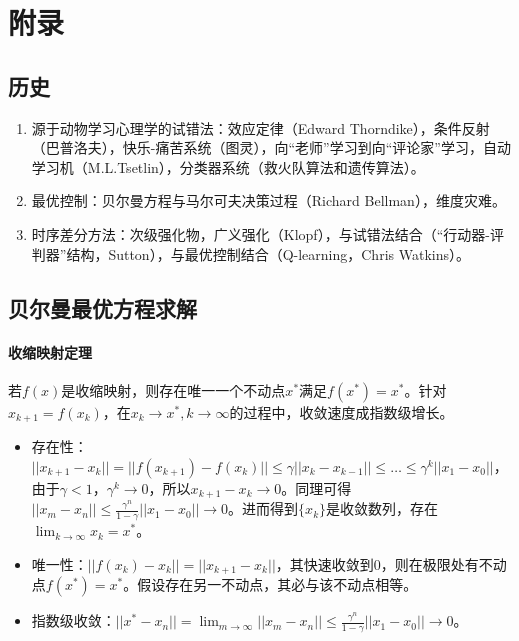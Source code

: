 \documentclass[
12pt, %
a4paper, 
oneside, %
headinclude,footinclude, %
]{scrartcl}
\begin{document}
\section{附录}
\subsection{历史}
\begin{enumerate}
\item 源于动物学习心理学的试错法：效应定律（Edward Thorndike），条件反射（巴普洛夫），快乐-痛苦系统（图灵），向“老师”学习到向“评论家”学习，自动学习机（M.L.Tsetlin），分类器系统（救火队算法和遗传算法）。
\item 最优控制：贝尔曼方程与马尔可夫决策过程（Richard Bellman），维度灾难。
\item 时序差分方法：次级强化物，广义强化（Klopf），与试错法结合（“行动器-评判器”结构，Sutton），与最优控制结合（Q-learning，Chris Watkins）。
\end{enumerate}
\subsection{贝尔曼最优方程求解}\label{sec:Scalability Mapping}
\paragraph{收缩映射定理}
若$ f(x) $是收缩映射，则存在唯一一个不动点$ x^* $满足$ f(x^*) = x^* $。针对$ x_{k + 1} = f(x_k) $，在$ x_k \to x^*, k \to \infty $的过程中，收敛速度成指数级增长。
\begin{itemize}
\item 存在性：$ ||x_{k + 1} - x_k|| = ||f(x_{k + 1}) - f(x_k)|| \leq \gamma||x_k - x_{k - 1}|| \leq \dots \leq \gamma^k||x_1 - x_0|| $，由于$ \gamma < 1 $，$ \gamma^k \to 0 $，所以$ x_{k + 1} - x_k \to 0 $。同理可得$ ||x_m - x_n|| \leq \frac{\gamma^n}{1 - \gamma}||x_1 - x_0|| \to 0 $。进而得到$ \{x_k\} $是收敛数列，存在$ \lim_{k \to \infty} x_k = x^* $。
\item 唯一性：$ ||f(x_k) - x_k|| = ||x_{k + 1} - x_k||$，其快速收敛到$ 0 $，则在极限处有不动点$ f(x^*) = x^* $。假设存在另一不动点，其必与该不动点相等。
\item 指数级收敛：$ ||x^* - x_n|| = \lim_{m \to \infty}||x_m - x_n|| \leq \frac{\gamma^n}{1 - \gamma}||x_1 - x_0|| \to 0 $。
\end{itemize}
\end{document}
